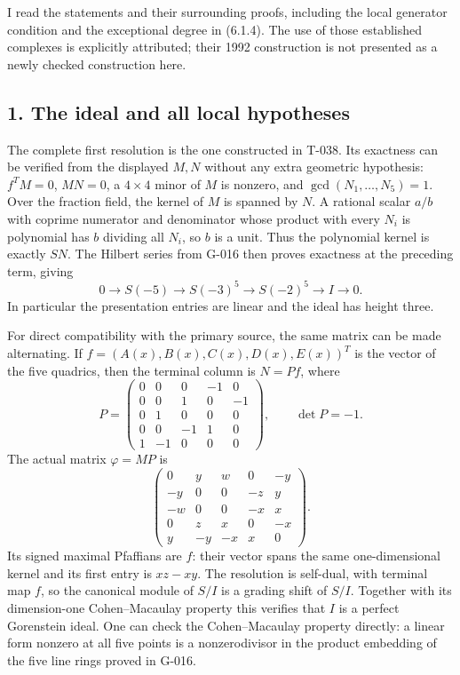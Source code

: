 \documentclass[
  10pt,
]{article}
\begin{document}
I read the statements and their surrounding proofs, including the local
generator condition and the exceptional degree in (6.1.4). The use of
those established complexes is explicitly attributed; their 1992
construction is not presented as a newly checked construction here.

\subsection{1. The ideal and all local
hypotheses}\label{the-ideal-and-all-local-hypotheses}

The complete first resolution is the one constructed in T-038. Its
exactness can be verified from the displayed \(M,N\) without any extra
geometric hypothesis: \(f^TM=0\), \(MN=0\), a \(4\times4\) minor of
\(M\) is nonzero, and \(\gcd(N_1,\ldots,N_5)=1\). Over the fraction
field, the kernel of \(M\) is spanned by \(N\). A rational scalar
\(a/b\) with coprime numerator and denominator whose product with every
\(N_i\) is polynomial has \(b\) dividing all \(N_i\), so \(b\) is a
unit. Thus the polynomial kernel is exactly \(SN\). The Hilbert series
from G-016 then proves exactness at the preceding term, giving \[
0\longrightarrow S(-5)\longrightarrow S(-3)^5
\longrightarrow S(-2)^5\longrightarrow I\longrightarrow0.
\] In particular the presentation entries are linear and the ideal has
height three.

For direct compatibility with the primary source, the same matrix can be
made alternating. If \(f=(A(x),B(x),C(x),D(x),E(x))^T\) is the vector of
the five quadrics, then the terminal column is \(N=Pf\), where \[
P=\begin{pmatrix}
0&0&0&-1&0\\
0&0&1&0&-1\\
0&1&0&0&0\\
0&0&-1&1&0\\
1&-1&0&0&0
\end{pmatrix},\qquad\det P=-1.
\] The actual matrix \(\varphi=MP\) is \[
\begin{pmatrix}
0&y&w&0&-y\\
-y&0&0&-z&y\\
-w&0&0&-x&x\\
0&z&x&0&-x\\
y&-y&-x&x&0
\end{pmatrix}.
\] Its signed maximal Pfaffians are \(f\): their vector spans the same
one-dimensional kernel and its first entry is \(xz-xy\). The resolution
is self-dual, with terminal map \(f\), so the canonical module of
\(S/I\) is a grading shift of \(S/I\). Together with its dimension-one
Cohen--Macaulay property this verifies that \(I\) is a perfect
Gorenstein ideal. One can check the Cohen--Macaulay property directly: a
linear form nonzero at all five points is a nonzerodivisor in the
product embedding of the five line rings proved in G-016.
\end{document}
